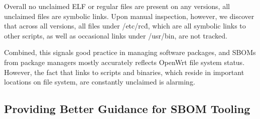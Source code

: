 Overall no unclaimed ELF or regular files are present on any versions, all unclaimed files are symbolic links. Upon manual inspection, however, we discover that across all versions, all files under /etc/rc\.d, which are all symbolic links to other scripts, as well as occasional links under /usr/bin, are not tracked. \par
Combined, this signals good practice in managing software packages, and SBOMs from package managers mostly accurately reflects OpenWrt file system status. However, the fact that links to scripts and binaries, which reside in important locations on file system, are constantly unclaimed is alarming.\par
\subsection{Providing Better Guidance for SBOM Tooling}



